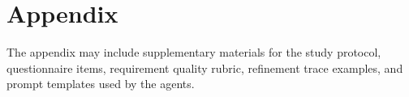 \section{Appendix}
\label{appendix}
The appendix may include supplementary materials for the study protocol, questionnaire items, requirement quality rubric, refinement trace examples, and prompt templates used by the agents.
